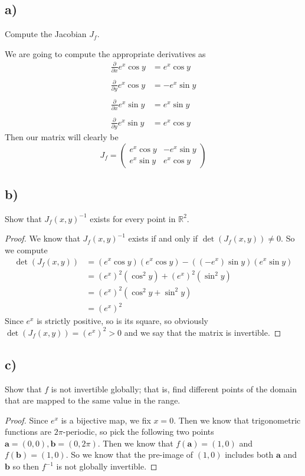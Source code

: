 \documentclass{article}
\theoremstyle{definition}
\begin{document}
\subsection*{a)}
\begin{mdframed}[]
    Compute the Jacobian $J_f$.
\end{mdframed}
We are going to compute the appropriate derivatives as
\begin{align*}
    \frac{\partial}{\partial x}e^x \cos y &= e^x \cos y \\\\
    \frac{\partial}{\partial y}e^x \cos y &= -e^x \sin y \\\\
    \frac{\partial}{\partial x}e^x \sin y &= e^x \sin y \\\\
    \frac{\partial}{\partial y}e^x \sin y &= e^x \cos y 
\end{align*}
Then our matrix will clearly be 
\[
    J_f = \begin{pmatrix}
        e^x \cos y & -e^x \sin y\\
        e^x \sin y & e^x \cos y 
    \end{pmatrix}
\]
\subsection*{b)}
\begin{mdframed}[]
    Show that $J_f(x,y)^{-1}$ exists for every point in $\mathbb{R}^2$.
\end{mdframed}
\begin{proof}
We know that $J_f(x,y)^{-1}$ exists if and only if $\det (J_f(x,y)) \neq 0$. So we compute 
    \begin{align*}
        \det (J_f(x,y)) & = (e^x \cos y)(e^x \cos y) - ((-e^x) \sin y)(e^x \sin y) \\
        &= (e^x)^2(\cos^2 y) + (e^x)^2(\sin^2 y) \\
        &= (e^x)^2(\cos^2 y + \sin^2 y) \\
        &= (e^x)^2
    \end{align*}
    Since $e^x$ is strictly positive, so is its square, so obviously $\det(J_f(x,y)) = (e^x)^2 > 0$
    and we say that the matrix is invertible.
\end{proof}
\subsection*{c)}
\begin{mdframed}[]
    Show that $f$ is not invertible globally; that is, find different points of the domain
    that are mapped to the same value in the range.
\end{mdframed}
\begin{proof}
    Since $e^x$ is a bijective map, we fix $x = 0$. Then we know that trigonometric functions 
    are $2\pi$-periodic, so pick the following two points $\bm a = (0,0), \bm b = (0,2\pi)$.
    Then we know that $f(\bm a) = (1, 0)$ and $f(\bm b) = (1, 0)$. So we know that the pre-image 
    of $(1,0)$ includes both $\bm a$ and $\bm b$ so then $f^{-1}$ is not globally invertible.
\end{proof}
\end{document}
